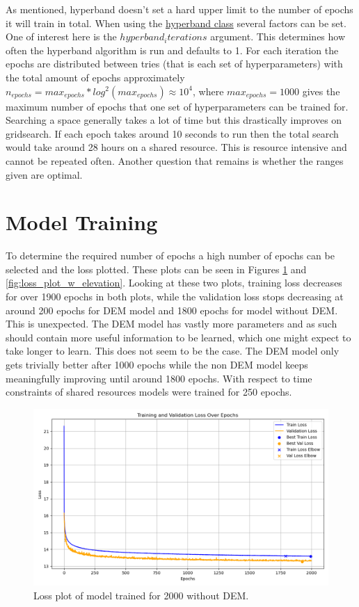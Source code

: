 As mentioned, hyperband doesn't set a hard upper limit to the number of epochs it will train in total. When using the \href{https://keras.io/api/keras_tuner/tuners/hyperband/}{hyperband class} several factors can be set. One of interest here is the $hyperband_iterations$ argument. This determines how often the hyperband algorithm is run and defaults to 1. For each iteration the epochs are distributed between tries (that is each set of hyperparameters) with the total amount of epochs approximately $n_{epochs} = max_{epochs} * log^2(max_{epochs})\approx 10^4$, where $max_{epochs} = 1000$ gives the maximum number of epochs that one set of hyperparameters can be trained for. Searching a space generally takes a lot of time but this drastically improves on gridsearch. If each epoch takes around 10 seconds to run then the total search would take around 28 hours on a shared resource. This is resource intensive and cannot be repeated often. Another question that remains is whether the ranges given are optimal.

\section{Model Training}
To determine the required number of epochs a high number of epochs can be selected and the loss plotted. These plots can be seen in Figures \ref{fig:loss_plot_wo_elevation} and \ref{fig:loss_plot_w_elevation}. Looking at these two plots, training loss decreases for over 1900 epochs in both plots, while the validation loss stops decreasing at around 200 epochs for DEM model and 1800 epochs for model without DEM. This is unexpected. The DEM model has vastly more parameters and as such should contain more useful information to be learned, which one might expect to take longer to learn. This does not seem to be the case. The DEM model only gets trivially better after 1000 epochs while the non DEM model keeps meaningfully improving until around 1800 epochs. With respect to time constraints of shared resources models were trained for 250 epochs.

\begin{figure}
    \centering
    \includegraphics[scale = 0.6]{Figures/loss_plot_wo_elevation.png}
    \caption[Loss plot of model trained for 2000 without DEM.]{Loss plot of model trained for 2000 without DEM.}
    \label{fig:loss_plot_wo_elevation}
\end{figure}


